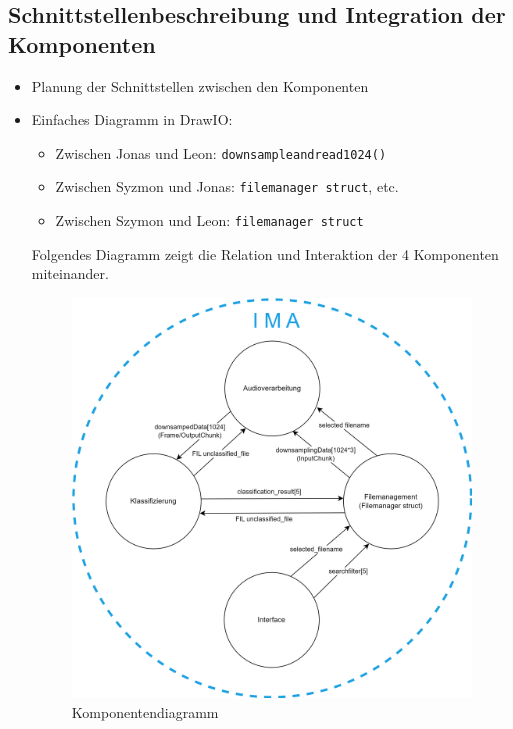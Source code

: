 \newpage

\subsection{Schnittstellenbeschreibung und Integration der Komponenten}
\begin{itemize}
    \item Planung der Schnittstellen zwischen den Komponenten
    \item Einfaches Diagramm in DrawIO:
    \begin{itemize}
        \item Zwischen Jonas und Leon: \texttt{downsampleandread1024()}
        \item Zwischen Syzmon und Jonas: \texttt{filemanager struct}, etc.
        \item Zwischen Szymon und Leon: \texttt{filemanager struct}
    \end{itemize}
    
    
    Folgendes Diagramm zeigt die Relation und Interaktion der 4 Komponenten miteinander.
    
    \begin{figure}[H]
    	\centering
    	\includegraphics[width=1.0\textwidth]{images/04_spezifikation/komponentendiagramm.drawio.png}
    	\caption{Komponentendiagramm}
    	\label{fig:komponentendiagramm}
    \end{figure}
    
\end{itemize}

